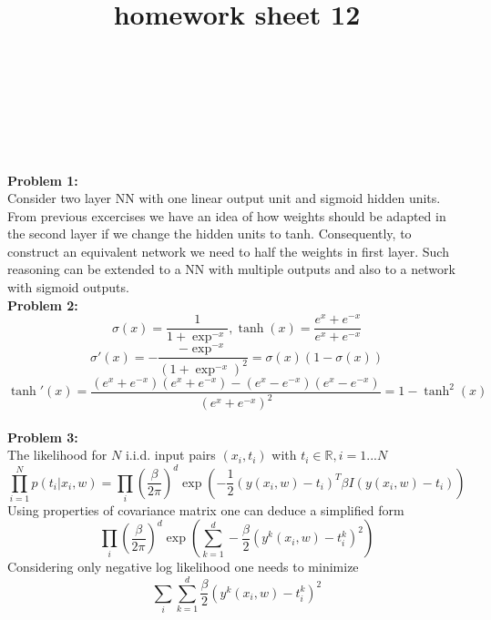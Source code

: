 \documentclass{article}
\title{homework sheet 12}
\author{
	\name{Denys Sobchyshak}\\
	\imat{03636581}\\
	\email{denys.sobchyshak@tum.de}
	\And
	\name{Sergey Zakharov} \\
	\imat{03636642}\\
	\email{ga39pad@mytum.de}
}
\begin{document}
\maketitle
\textbf{Problem 1:} \\
Consider two layer NN with one linear output unit and sigmoid hidden units. From previous excercises we have an idea of how weights should be adapted in the second layer if we change the hidden units to tanh. Consequently, to construct an equivalent network we need to half the weights in first layer. Such reasoning can be extended to a NN with multiple outputs and also to a network with sigmoid outputs.
\\

\textbf{Problem 2:} \\
$$\sigma(x)=\frac{1}{1+\exp^{-x}}, \tanh(x)=\frac{e^x+e^{-x}}{e^x+e^{-x}}$$
$$\sigma'(x)=-\frac{-\exp^{-x}}{(1+\exp^{-x})^2}=\sigma(x)(1-\sigma(x))$$
$$\tanh'(x)=\frac{(e^x+e^{-x})(e^x+e^{-x})-(e^x-e^{-x})(e^x-e^{-x})}{(e^x+e^{-x})^2}=1-\tanh^2(x)$$
\\

\textbf{Problem 3:} \\
The likelihood for $N$ i.i.d. input pairs $(x_i,t_i)$ with $t_i \in \mathbb{R}, i=1...N$
$$\prod_{i=1}^{N}p(t_i|x_i,w)=\prod_{i}(\frac{\beta}{2\pi})^d\exp(-\frac{1}{2}(y(x_i,w)-t_i)^T\beta I(y(x_i,w)-t_i))$$
Using properties of covariance matrix one can deduce a simplified form
$$\prod_{i}(\frac{\beta}{2\pi})^d\exp(\sum_{k=1}^{d}-\frac{\beta}{2}(y^k(x_i,w)-t^k_i)^2)$$
Considering only negative log likelihood one needs to minimize
$$ \sum_{i}\sum_{k=1}^{d}\frac{\beta}{2}(y^k(x_i,w)-t_i^k)^2$$
\\
\end{document}
